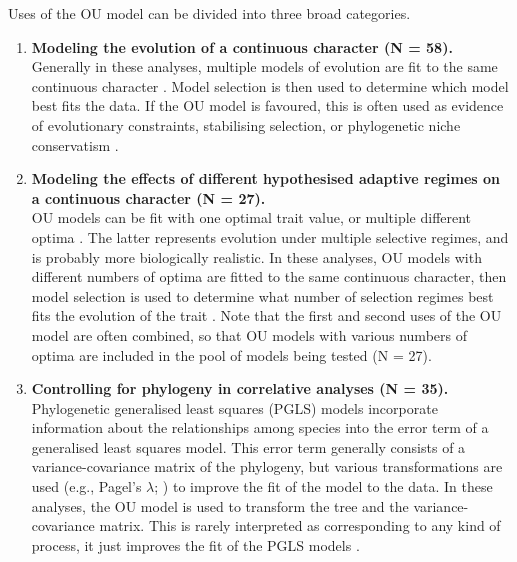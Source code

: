 \documentclass[a4paper,12pt]{article}
\begin{document}
  Uses of the OU model can be divided into three broad categories. %
    \begin{enumerate}
      \item \textbf{Modeling the evolution of a continuous character (N = 58).}\\ 
            Generally in these analyses, multiple models of evolution are fit to the same continuous character \citep[e.g.,][]{Harmon:2010aa}. Model selection is then used to determine which model best fits the data. 
            If the OU model is favoured, this is often used as evidence of evolutionary constraints, stabilising selection, or phylogenetic niche conservatism \citep[e.g.,][]{Harmon:2010aa,cooper2010body,Wiens:2010aa,christin2013anatomical}.
      \item \textbf{Modeling the effects of different hypothesised adaptive regimes on a continuous character (N = 27).}\\
            OU models can be fit with one optimal trait value, or multiple different optima \citep{Butler:2004aa}. 
            The latter represents evolution under multiple selective regimes, and is probably more biologically realistic. 
            In these analyses, OU models with different numbers of optima are fitted to the same continuous character, then model selection is used to determine what number of selection regimes best fits the evolution of the trait \citep[e.g.,][]{beaulieu2012modeling}.
            Note that the first and second uses of the OU model are often combined, so that OU models with various numbers of optima are included in the pool of models being tested (N = 27).
      \item \textbf{Controlling for phylogeny in correlative analyses (N = 35).}\\ 
            Phylogenetic generalised least squares (PGLS) models incorporate information about the relationships among species into the error term of a generalised least squares model. 
            This error term generally consists of a variance-covariance matrix of the phylogeny, but various transformations are used (e.g., Pagel's $\lambda$; \citealp{Pagel:1997aa}) to improve the fit of the model to the data. 
            In these analyses, the OU model is used to transform the tree and the variance-covariance matrix.
            This is rarely interpreted as corresponding to any kind of process, it just improves the fit of the PGLS models \citep[e.g.,][]{blankers2012ecological}.
    \end{enumerate}
\end{document}
